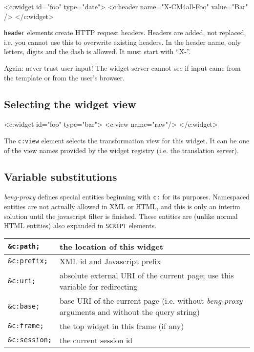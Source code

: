 \documentclass[a4paper,12pt]{article}
\begin{document}
\begin{verbatim*}
<c:widget id="foo" type="date">
  <c:header name="X-CM4all-Foo" value="Bar" />
</c:widget>
\end{verbatim*}

\texttt{header} elements create HTTP request headers.  Headers are
added, not replaced, i.e. you cannot use this to overwrite existing
headers.  In the header name, only letters, digits and the dash is
allowed.  It must start with ``X-''.

Again: never trust user input!  The widget server cannot see if input
came from the template or from the user's browser.

\subsection{Selecting the widget view}

\begin{verbatim*}
<c:widget id="foo" type="bar">
  <c:view name="raw"/>
</c:widget>
\end{verbatim*}

The \texttt{c:view} element selects the transformation view for this
widget.  It can be one of the view names provided by the widget
registry (i.e. the translation server).

\subsection{Variable substitutions}

\emph{beng-proxy} defines special entities beginning with \texttt{c:}
for its purposes.  Namespaced entities are not actually allowed in XML
or HTML, and this is only an interim solution until the javascript
filter is finished.  These entities are (unlike normal HTML entities)
also expanded in \texttt{SCRIPT} elements.

\begin{tabular}{|l|p{8cm}|}
\hline
\texttt{\&c:path;} & the location of this widget \\
\hline
\texttt{\&c:prefix;} & XML id and Javascript prefix \\
\hline
\texttt{\&c:uri;} & absolute external URI of the current page; use
this variable for redirecting \\
\hline

\texttt{\&c:base;} & base URI of the current page (i.e. without
\emph{beng-proxy} arguments and without the query string) \\

\hline
\texttt{\&c:frame;} & the top widget in this frame (if any) \\
\hline
\texttt{\&c:session;} & the current session id \\
\hline
\end{tabular}
\end{document}
